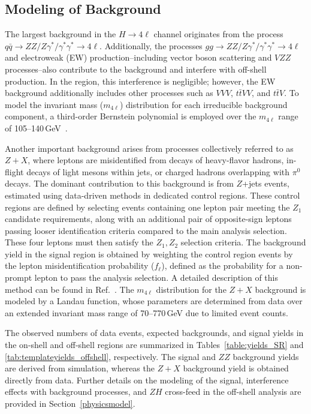 \subsection{Modeling of Background}

The largest background in the $H \to 4\ell$ channel originates from the process $q\bar{q} \to ZZ/Z\gamma^*/\gamma^*\gamma^* \to 4\ell$. Additionally, the processes $gg \to ZZ/Z\gamma^*/\gamma^*\gamma^* \to 4\ell$ and electroweak (EW) production--including vector boson scattering and $VZZ$ processes--also contribute to the background and interfere with off-shell \Hboson production. In the \onshell region, this interference is negligible; however, the EW background additionally includes other processes such as $VVV$, $t\bar{t}VV$, and $t\bar{t}V$. To model the invariant mass ($m_{4\ell}$) distribution for each irreducible background component, a third-order Bernstein polynomial is employed over the $m_{4\ell}$ range of 105--140\,GeV~\cite{PhysRevD.111.092014}.

Another important background arises from processes collectively referred to as $Z+X$, where leptons are misidentified from decays of heavy-flavor hadrons, in-flight decays of light mesons within jets, or charged hadrons overlapping with $\pi^0$ decays. The dominant contribution to this background is from $Z$+jets events, estimated using data-driven methods in dedicated control regions. These control regions are defined by selecting events containing one lepton pair meeting the ${Z}_{1}$ candidate requirements, along with an additional pair of opposite-sign leptons passing looser identification criteria compared to the main analysis selection. These four leptons must then satisfy the ${Z}_{1}, {Z}_{2}$ selection criteria. The background yield in the signal region is obtained by weighting the control region events by the lepton misidentification probability ($f_{\ell}$), defined as the probability for a non-prompt lepton to pass the analysis selection. A detailed description of this method can be found in Ref.~\cite{Sirunyan:2017exp}. The $m_{4\ell}$ distribution for the $Z+X$ background is modeled by a Landau function, whose parameters are determined from data over an extended invariant mass range of 70--770\,GeV due to limited event counts.

The observed numbers of data events, expected backgrounds, and signal yields in the on-shell and off-shell regions are summarized in Tables~\ref{table:yields_SR} and \ref{tab:templateyields_offshell}, respectively. The signal and $ZZ$ background yields are derived from simulation, whereas the $Z+X$ background yield is obtained directly from data. Further details on the modeling of the \Hboson signal, interference effects with background processes, and $ZH$ cross-feed in the off-shell analysis are provided in Section~\ref{physicsmodel}.


